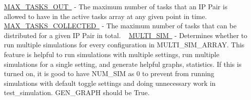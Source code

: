  \mbox{\hyperlink{namespacedynamicfilterapp_1_1toggles_a27cea6b210bbcb9af3fbd7edc3901390}{M\+A\+X\+\_\+\+T\+A\+S\+K\+S\+\_\+\+O\+UT }} -\/ The maximum number of tasks that an IP Pair is allowed to have in the active tasks array at any given point in time. ~\newline
 \mbox{\hyperlink{namespacedynamicfilterapp_1_1toggles_aa05c90c0672e9b74717bdeabb00fd1bb}{M\+A\+X\+\_\+\+T\+A\+S\+K\+S\+\_\+\+C\+O\+L\+L\+E\+C\+T\+ED }} -\/ The maximum number of tasks that can be distributed for a given IP Pair in total. ~\newline
 \mbox{\hyperlink{namespacedynamicfilterapp_1_1toggles_a8822be27c516d0f027cff60d067b6d87}{M\+U\+L\+T\+I\+\_\+\+S\+IM }} -\/ Determines whether to run multiple simulations for every configuration in M\+U\+L\+T\+I\+\_\+\+S\+I\+M\+\_\+\+A\+R\+R\+AY. This feature is helpful to run simulations with multiple settings, run multiple simulations for a single setting, and generate helpful graphs, statistics. If this is turned on, it is good to have N\+U\+M\+\_\+\+S\+IM as 0 to prevent from running simulations with default toggle settings and doing unnecessary work in test\+\_\+simulation. G\+E\+N\+\_\+\+G\+R\+A\+PH should be True.
